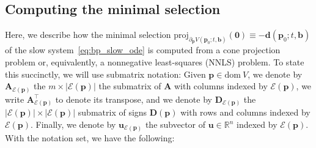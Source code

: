 \documentclass[11pt]{article}
\numberwithin{prop}{section}
\numberwithin{lem}{section}
\numberwithin{rem}{section}
\numberwithin{cor}{section}
\numberwithin{thm}{section}
\numberwithin{defn}{section}
\numberwithin{fact}{section}
\theoremstyle{plain}
\def\bb {\boldsymbol{b}}
\def\bd {\boldsymbol{d}}
\def\bp {\boldsymbol{p}}
\def\bu {\boldsymbol{u}}
\def\R {\mathbb{R}}
\newcommand{\matr}[1]{\bm{#1}}
\def\dom {\mathrm{dom~}}    %
\def\proj {\mathrm{proj}}
\def\Rn {\R^n}
\def\bpo {\bp_{0}}
\def\ep {\mathcal{E}(\bp)}
\begin{document}
\subsection{Computing the minimal selection}\label{subsec:computing_ms}
Here, we describe how the minimal selection $\proj_{\partial_{\bp} V(\bpo;t,\bb)}(\boldsymbol{0}) \equiv -\bd(\bpo;t,\bb)$ of the slow system~\eqref{eq:bp_slow_ode} is computed from a cone projection problem or, equivalently, a nonnegative least-squares (NNLS) problem. To state this succinctly, we will use submatrix notation: Given $\bp \in \dom V$, we denote by $\matr{A}_{\ep}$ the $m \times |\ep|$ the submatrix of $\matr{A}$ with columns indexed by $\ep$, we write $\matr{A}^{\top}_{\ep}$ to denote its transpose, and we denote by $\matr{D}_{\ep}$ the $|\ep| \times |\ep|$ submatrix of signs $\matr{D}(\bp)$ with rows and columns indexed by $\ep$. Finally, we denote by $\bu_{\ep}$ the subvector of $\bu \in \Rn$ indexed by $\ep$. With the notation set, we have the following:
\end{document}
